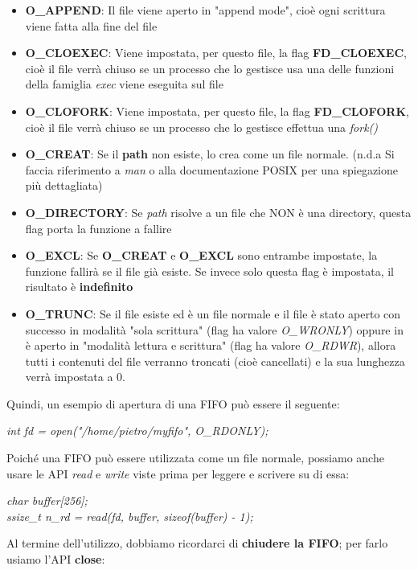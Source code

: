 \documentclass[12pt]{article}
\begin{document}
\begin{itemize}
    \item \textbf{O\_APPEND}: Il file viene aperto in "append mode", cioè ogni scrittura viene fatta alla fine del file
    \item \textbf{O\_CLOEXEC}: Viene impostata, per questo file, la flag \textbf{FD\_CLOEXEC}, cioè il file verrà chiuso se un processo che lo gestisce usa una delle funzioni della famiglia \textit{exec} viene eseguita sul file
    \item \textbf{O\_CLOFORK}: Viene impostata, per questo file, la flag \textbf{FD\_CLOFORK}, cioè il file verrà chiuso se un processo che lo gestisce effettua una \textit{fork()}
    \item \textbf{O\_CREAT}: Se il \textbf{path} non esiste, lo crea come un file normale. (n.d.a Si faccia riferimento a \textit{man} o alla documentazione POSIX per una spiegazione più dettagliata)
    \item \textbf{O\_DIRECTORY}: Se \textit{path} risolve a un file che NON è una directory, questa flag porta la funzione a fallire
    \item \textbf{O\_EXCL}: Se \textbf{O\_CREAT} e \textbf{O\_EXCL} sono entrambe impostate, la funzione fallirà se il file già esiste. Se invece solo questa flag è impostata, il risultato è \textbf{indefinito}
    \item \textbf{O\_TRUNC}: Se il file esiste ed è un file normale e il file è stato aperto con successo in modalità "sola scrittura" (flag ha valore \textit{O\_WRONLY}) oppure in è aperto in "modalità lettura e scrittura" (flag ha valore \textit{O\_RDWR}), allora tutti i contenuti del file verranno troncati (cioè cancellati) e la sua lunghezza verrà impostata a 0.
\end{itemize}
Quindi, un esempio di apertura di una FIFO può essere il seguente:
\begin{center}
    \textit{int fd = open("/home/pietro/myfifo", O\_RDONLY);}
\end{center}
Poiché una FIFO può essere utilizzata come un file normale, possiamo anche usare le API \textit{read} e \textit{write} viste prima per leggere e scrivere su di essa:
\begin{center}
    \textit{char buffer[256];} \\
    \textit{ssize\_t n\_rd = read(fd, buffer, sizeof(buffer) - 1);}
\end{center}
Al termine dell'utilizzo, dobbiamo ricordarci di \textbf{chiudere la FIFO}; per farlo usiamo l'API \textbf{close}:
\end{document}
